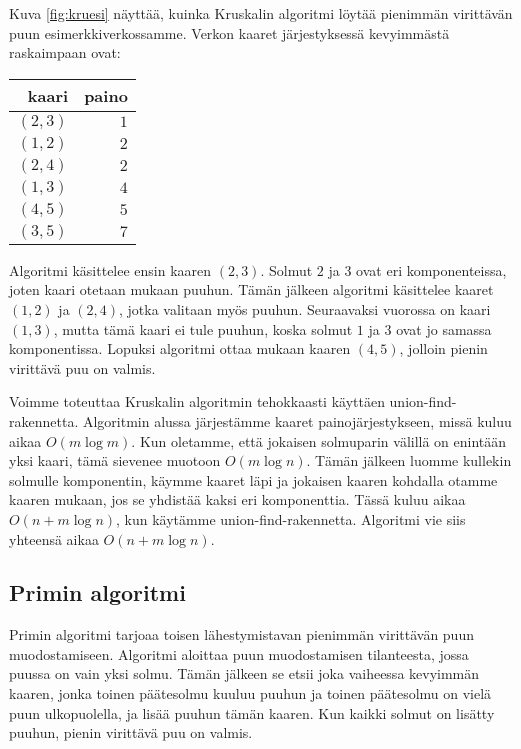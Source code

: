 Kuva \ref{fig:kruesi} näyttää, kuinka Kruskalin algoritmi löytää pienimmän virittävän
puun esimerkkiverkossamme.
Verkon kaaret järjestyksessä kevyim\-mästä raskaimpaan ovat:

\begin{center}
\begin{tabular}{rr}
kaari & paino \\
\hline
$(2,3)$ & $1$ \\
$(1,2)$ & $2$ \\
$(2,4)$ & $2$ \\
$(1,3)$ & $4$ \\
$(4,5)$ & $5$ \\
$(3,5)$ & $7$ \\
\end{tabular}
\end{center}

Algoritmi käsittelee ensin kaaren $(2,3)$.
Solmut $2$ ja $3$ ovat eri komponenteissa,
joten kaari otetaan mukaan puuhun.
Tämän jälkeen algoritmi käsittelee kaaret $(1,2)$ ja $(2,4)$,
jotka valitaan myös puuhun.
Seuraavaksi vuorossa on kaari $(1,3)$,
mutta tämä kaari ei tule puuhun,
koska solmut $1$ ja $3$ ovat jo samassa komponentissa.
Lopuksi algoritmi ottaa mukaan kaaren $(4,5)$,
jolloin pienin virittävä puu on valmis.

Voimme toteuttaa Kruskalin algoritmin tehokkaasti
käyttäen union-find-rakennetta.
Algoritmin alussa järjestämme kaaret painojärjestykseen,
missä kuluu aikaa $O(m \log m)$.
Kun oletamme, että jokaisen solmuparin välillä
on enintään yksi kaari, tämä sievenee muotoon $O(m \log n)$.
Tämän jälkeen luomme kullekin solmulle komponentin,
käymme kaaret läpi ja jokaisen kaaren
kohdalla otamme kaaren mukaan, jos se yhdistää kaksi eri komponenttia.
Tässä kuluu aikaa $O(n+m \log n)$,
kun käytämme union-find-rakennetta.
Algoritmi vie siis yhteensä aikaa $O(n+m \log n)$.

\subsection{Primin algoritmi}

Primin algoritmi tarjoaa toisen lähestymistavan
pienimmän virittävän puun muodostamiseen.
Algoritmi aloittaa puun muodostamisen tilanteesta,
jossa puussa on vain yksi solmu.
Tämän jälkeen se etsii joka vaiheessa kevyimmän kaaren,
jonka toinen päätesolmu kuuluu puuhun ja toinen
päätesolmu on vielä puun ulkopuolella, ja lisää puuhun tämän kaaren.
Kun kaikki solmut on lisätty puuhun, pienin virittävä puu on valmis.

